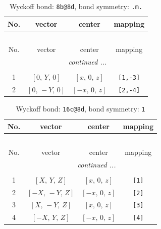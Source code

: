 \documentclass[fleqn,8pt]{jsarticle}
\begin{document}
\renewcommand{\arraystretch}{1.2}
\begin{longtable}{cccc}
\caption{Wyckoff bond: {\tt 8b@8d}, bond symmetry: {\tt .m.}}
 \\
 \hline \hline
No. & vector & center & mapping \\ \hline \endfirsthead

\multicolumn{3}{l}{\tablename\ \thetable{}} \\
 \hline \hline
No. & vector & center & mapping \\ \hline \endhead

 \hline \hline
\multicolumn{3}{r}{\footnotesize\it continued ...} \\ \endfoot

 \hline \hline
\multicolumn{3}{r}{} \\ \endlastfoot

1 & $\left[ 0,\, Y,\, 0 \right]$ & $\left[ x,\, 0,\, z \right]$ & {\tt [1,-3]} \\ \hline
2 & $\left[ 0,\, - Y,\, 0 \right]$ & $\left[ - x,\, 0,\, z \right]$ & {\tt [2,-4]} \\
\end{longtable}
\renewcommand{\arraystretch}{1.2}
\begin{longtable}{cccc}
\caption{Wyckoff bond: {\tt 16c@8d}, bond symmetry: {\tt 1}}
 \\
 \hline \hline
No. & vector & center & mapping \\ \hline \endfirsthead

\multicolumn{3}{l}{\tablename\ \thetable{}} \\
 \hline \hline
No. & vector & center & mapping \\ \hline \endhead

 \hline \hline
\multicolumn{3}{r}{\footnotesize\it continued ...} \\ \endfoot

 \hline \hline
\multicolumn{3}{r}{} \\ \endlastfoot

1 & $\left[ X,\, Y,\, Z \right]$ & $\left[ x,\, 0,\, z \right]$ & {\tt [1]} \\ \hline
2 & $\left[ - X,\, - Y,\, Z \right]$ & $\left[ - x,\, 0,\, z \right]$ & {\tt [2]} \\ \hline
3 & $\left[ X,\, - Y,\, Z \right]$ & $\left[ x,\, 0,\, z \right]$ & {\tt [3]} \\ \hline
4 & $\left[ - X,\, Y,\, Z \right]$ & $\left[ - x,\, 0,\, z \right]$ & {\tt [4]} \\
\end{longtable}
\end{document}
